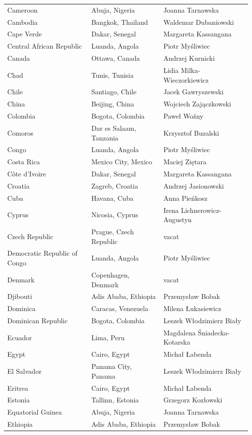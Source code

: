 \documentclass{article}
\begin{document}
\begin{tabular}{lll}
Cameroon & Abuja, Nigeria & Joanna Tarnawska \\
Cambodia & Bangkok, Thailand & Waldemar Dubaniowski \\
Cape Verde & Dakar, Senegal & Margareta Kassangana \\
Central African Republic & Luanda, Angola & Piotr Myśliwiec \\
Canada & Ottawa, Canada & Andrzej Kurnicki \\
Chad & Tunis, Tunisia & Lidia Milka-Wieczorkiewicz \\
Chile & Santiago, Chile & Jacek Gawryszewski \\
China & Beijing, China & Wojciech Zajączkowski \\
Colombia & Bogota, Colombia & Paweł Woźny \\
Comoros & Dar es Salaam, Tanzania & Krzysztof Buzalski \\
Congo & Luanda, Angola & Piotr Myśliwiec \\
Costa Rica & Mexico City, Mexico & Maciej Ziętara \\
Côte d'Ivoire & Dakar, Senegal & Margareta Kassangana \\
Croatia & Zagreb, Croatia & Andrzej Jasionowski \\
Cuba & Havana, Cuba & Anna Pieńkosz \\
Cyprus & Nicosia, Cyprus & Irena Lichnerowicz-Augustyn \\
Czech Republic & Prague, Czech Republic & vacat \\
Democratic Republic of Congo & Luanda, Angola & Piotr Myśliwiec \\
Denmark & Copenhagen, Denmark & vacat \\
Djibouti & Adis Ababa, Ethiopia & Przemysław Bobak \\
Dominica & Caracas, Venezuela & Milena Łukasiewicz \\
Dominican Republic & Bogota, Colombia & Leszek Włodzimierz Biały \\
Ecuador & Lima, Peru & Magdalena Śniadecka-Kotarska \\
Egypt & Cairo, Egypt & Michał Łabenda \\
El Salvador & Panama City, Panama & Leszek Włodzimierz Biały \\
Eritrea & Cairo, Egypt & Michał Łabenda \\
Estonia & Tallinn, Estonia & Grzegorz Kozłowski \\
Equatorial Guinea & Abuja, Nigeria & Joanna Tarnawska \\
Ethiopia & Adis Ababa, Ethiopia & Przemysław Bobak \\

\end{tabular}
\end{document}
